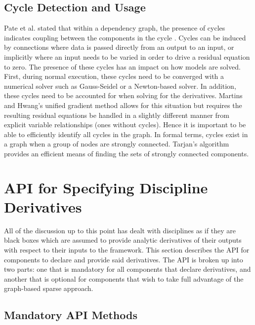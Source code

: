\documentclass[]{aiaa-tc} %
\begin{document}
    \subsection{Cycle Detection and Usage}
        Pate et al. stated that within a dependency graph, the presence of cycles indicates coupling between
        the components in the cycle \cite{graph_problem2013}. Cycles can be induced by connections
        where data is passed directly from an output to an input, or implicitly where an input needs to
        be varied in order to drive a residual equation to zero. The presence of these cycles has 
        an impact on how models are solved. First, during normal execution, these cycles 
        need to be converged with a numerical solver such as Gauss-Seidel or a Newton-based solver.
        In addition, these cycles need to be accounted for when solving for the derivatives. Martins and Hwang's 
        unified gradient method allows for this situation but requires the resulting residual equations be
        handled in a slightly different manner from explicit variable relationships (ones without cycles). Hence 
        it is important to be able to efficiently identify all cycles in the graph. In formal terms, 
        cycles exist in a graph when a group of nodes are strongly connected. Tarjan's algorithm provides 
        an efficient means of finding the sets of strongly connected components\cite{tarjan1972depth,nuutila1994finding}. 


    \section{API for Specifying Discipline Derivatives}

        All of the discussion up to this point has dealt with disciplines as if they are black boxes
        which are assumed to provide analytic derivatives of their outputs with respect to their inputs
        to the framework. This section describes the API for components to declare and provide
        said derivatives. The API is broken up into two parts: one that is mandatory for all components
        that declare derivatives, and another that is optional for components that wish to take full
        advantage of the graph-based sparse approach.

        \subsection{Mandatory API Methods}
\end{document}
